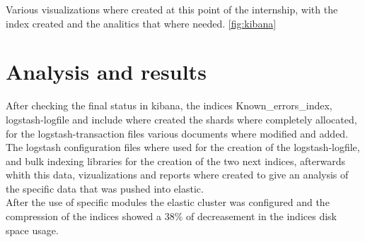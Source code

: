 Various visualizations where created at this point of the internship, with the index created and the analitics that where needed. \autoref{fig:kibana}

\section{Analysis and results}

After checking the final status in kibana, the indices Known\_errors\_index, logstash-logfile and include where created the shards where completely allocated, for the logstash-transaction files various documents where modified and added.
\\

The logstash configuration files where used for the creation of the logstash-logfile, and bulk indexing libraries for the creation of the two next indices, afterwards whith this data, vizualizations and reports where created to give an analysis of the specific data that was pushed into elastic.
\\

After the use of specific modules the elastic cluster was configured and the compression of the indices showed a 38\% of decreasement in the indices disk space usage. 